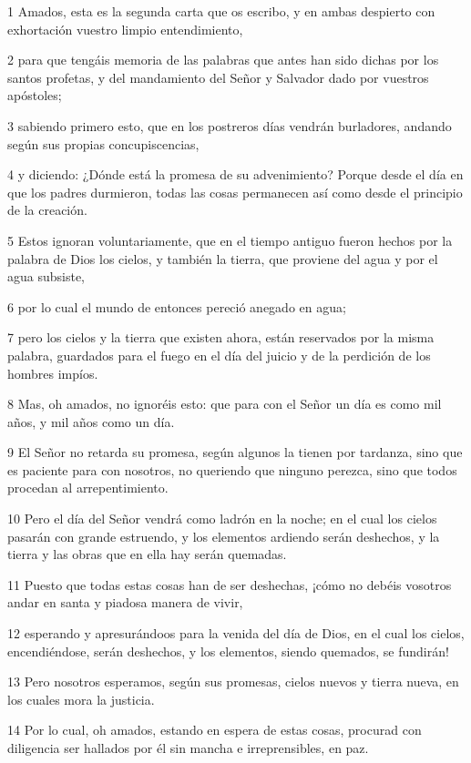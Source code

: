 \par 1 Amados, esta es la segunda carta que os escribo, y en ambas despierto con exhortación vuestro limpio entendimiento,
\par 2 para que tengáis memoria de las palabras que antes han sido dichas por los santos profetas, y del mandamiento del Señor y Salvador dado por vuestros apóstoles;
\par 3 sabiendo primero esto, que en los postreros días vendrán burladores, andando según sus propias concupiscencias,
\par 4 y diciendo: ¿Dónde está la promesa de su advenimiento? Porque desde el día en que los padres durmieron, todas las cosas permanecen así como desde el principio de la creación.
\par 5 Estos ignoran voluntariamente, que en el tiempo antiguo fueron hechos por la palabra de Dios los cielos, y también la tierra, que proviene del agua y por el agua subsiste,
\par 6 por lo cual el mundo de entonces pereció anegado en agua;
\par 7 pero los cielos y la tierra que existen ahora, están reservados por la misma palabra, guardados para el fuego en el día del juicio y de la perdición de los hombres impíos.
\par 8 Mas, oh amados, no ignoréis esto: que para con el Señor un día es como mil años, y mil años como un día.
\par 9 El Señor no retarda su promesa, según algunos la tienen por tardanza, sino que es paciente para con nosotros, no queriendo que ninguno perezca, sino que todos procedan al arrepentimiento.
\par 10 Pero el día del Señor vendrá como ladrón en la noche; en el cual los cielos pasarán con grande estruendo, y los elementos ardiendo serán deshechos, y la tierra y las obras que en ella hay serán quemadas.
\par 11 Puesto que todas estas cosas han de ser deshechas, ¡cómo no debéis vosotros andar en santa y piadosa manera de vivir,
\par 12 esperando y apresurándoos para la venida del día de Dios, en el cual los cielos, encendiéndose, serán deshechos, y los elementos, siendo quemados, se fundirán!
\par 13 Pero nosotros esperamos, según sus promesas, cielos nuevos y tierra nueva, en los cuales mora la justicia.
\par 14 Por lo cual, oh amados, estando en espera de estas cosas, procurad con diligencia ser hallados por él sin mancha e irreprensibles, en paz.
